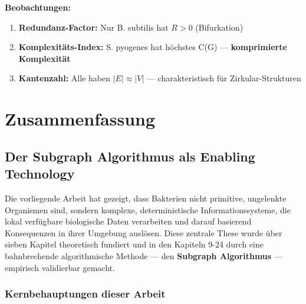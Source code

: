 \documentclass[a4paper,12pt]{article}
\theoremstyle{definition}
\begin{document}
\textbf{Beobachtungen:}

\begin{enumerate}
    \item \textbf{Redundanz-Factor:} Nur B. subtilis hat $R > 0$ (Bifurkation)
    \item \textbf{Komplexitäts-Index:} S. pyogenes hat höchstes C(G) --- \textbf{komprimierte Komplexität}
    \item \textbf{Kantenzahl:} Alle haben $|E| \approx |V|$ --- charakteristisch für Zirkular-Strukturen
\end{enumerate}

\section{Zusammenfassung}

\subsection{Der Subgraph Algorithmus als Enabling Technology}

Die vorliegende Arbeit hat gezeigt, dass Bakterien nicht primitive, ungelenkte Organismen sind, sondern komplexe, deterministische Informationssysteme, die lokal verfügbare biologische Daten verarbeiten und darauf basierend Konsequenzen in ihrer Umgebung auslösen. Diese zentrale These wurde über sieben Kapitel theoretisch fundiert und in den Kapiteln 9-24 durch eine bahnbrechende algorithmische Methode --- den \textbf{Subgraph Algorithmus} --- empirisch validierbar gemacht.

\subsubsection{Kernbehauptungen dieser Arbeit}
\end{document}
